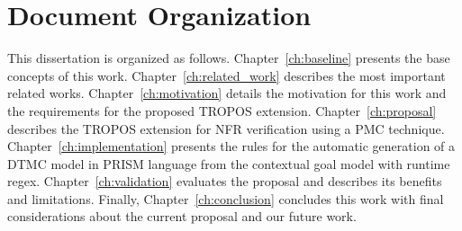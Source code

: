 \section{Document Organization}

This dissertation is organized as follows. Chapter~\ref{ch:baseline} presents the base concepts of this work. Chapter~\ref{ch:related_work} describes the most important related works. Chapter~\ref{ch:motivation} details the motivation for this work and the requirements for the proposed TROPOS extension. Chapter~\ref{ch:proposal} describes the  TROPOS extension for NFR verification using a PMC technique. Chapter~\ref{ch:implementation} presents the rules for the automatic generation of a DTMC model in PRISM language from the contextual goal model with runtime regex. Chapter~\ref{ch:validation} evaluates the proposal and describes its benefits and limitations. Finally, Chapter~\ref{ch:conclusion} concludes this work with final considerations about the current proposal and our future work.